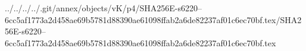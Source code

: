 ../../../../.git/annex/objects/vK/p4/SHA256E-s6220--6cc5af1773a2d458ae69b5781d88390ae61098ffab2a6de82237af01c6ec70bf.tex/SHA256E-s6220--6cc5af1773a2d458ae69b5781d88390ae61098ffab2a6de82237af01c6ec70bf.tex